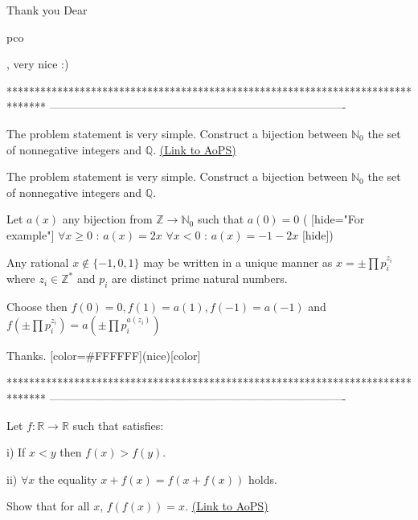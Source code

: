 \begin{solution}
	Thank you Dear \begin{bolded}pco\end{bolded} , very nice :)
\end{solution}
*******************************************************************************
-------------------------------------------------------------------------------

\begin{problem}
	The problem statement is very simple.
Construct a bijection between $\mathbb{N}_{0}$ the set of nonnegative integers and $\mathbb{Q}$.
	\flushright \href{https://artofproblemsolving.com/community/c6h475504}{(Link to AoPS)}
\end{problem}



\begin{solution}
	\begin{tcolorbox}The problem statement is very simple.
Construct a bijection between $\mathbb{N}_{0}$ the set of nonnegative integers and $\mathbb{Q}$.\end{tcolorbox}
Let $a(x)$ any bijection from $\mathbb Z\to\mathbb N_0$ such that $a(0)=0$ ( [hide="For example"]
$\forall x\ge 0$ : $a(x)=2x$
$\forall x<0$ : $a(x)=-1-2x$
[\/hide])

Any rational $x\notin\{-1,0,1\}$ may be written in a unique manner as $x=\pm\prod p_i^{z_i}$ where $z_i\in\mathbb Z^*$ and $p_i$ are distinct prime natural numbers.

Choose then $f(0)=0,f(1)=a(1),f(-1)=a(-1)$ and $f(\pm\prod p_i^{z_i})=a(\pm \prod p_i^{a(z_i)})$
\end{solution}



\begin{solution}
	Thanks.  [color=#FFFFFF](nice)[\/color]
\end{solution}
*******************************************************************************
-------------------------------------------------------------------------------

\begin{problem}
	Let $f: \mathbb{R} \to \mathbb{R}$ such that satisfies:

i) If $x<y$ then $f(x)>f(y)$.

ii) $\forall x$ the equality $x+f(x)=f(x+f(x))$ holds.

Show that for all $x$, $f(f(x))=x$.
	\flushright \href{https://artofproblemsolving.com/community/c6h475813}{(Link to AoPS)}
\end{problem}



